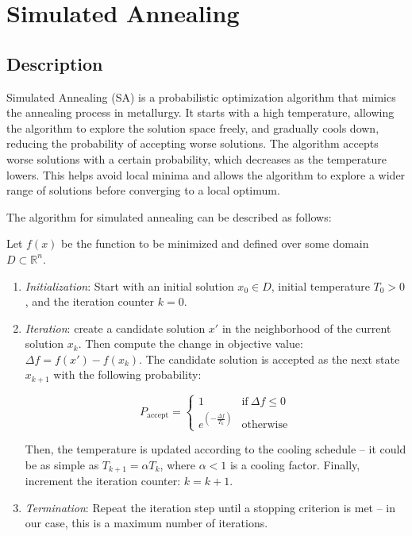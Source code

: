 \documentclass{article}
\begin{document}
\section{Simulated Annealing}

\subsection{Description}

Simulated Annealing (SA) is a probabilistic optimization algorithm
that mimics the annealing process in metallurgy. It starts with a
high temperature, allowing the algorithm to explore the solution space
freely, and gradually cools down, reducing the probability of accepting
worse solutions. The algorithm accepts worse solutions with a certain
probability, which decreases as the temperature lowers. This helps
avoid local minima and allows the algorithm to explore a wider range of
solutions before converging to a local optimum.

The algorithm for simulated annealing can be described as follows:

Let $f(x)$ be the function to be minimized and defined over some domain
$D \subset \mathbb{R}^n$.

\begin{enumerate}
  \item \textit{Initialization}: Start with an initial solution $x_0
    \in D$, initial temperature $T_0 > 0$, and the iteration counter $k = 0$.
  \item \textit{Iteration}: create a candidate solution $x'$ in the
    neighborhood of the current solution $x_k$. Then compute the
    change in objective value: $\Delta f = f(x') - f(x_k)$. The
    candidate solution is accepted as the next state $x_{k+1}$ with
    the following probability:

    $$ P_{\text{accept}} =
    \begin{cases} 1 & \text{if} \ \Delta f\leq 0\\ e^{(-\frac{\Delta f}{T_{k}})} & \text{otherwise}
    \end{cases} $$

    Then, the temperature is updated according to the cooling
    schedule -- it could be as simple as $T_{k+1} = \alpha T_k$,
    where $\alpha < 1$ is a cooling factor. Finally, increment the
    iteration counter: $k = k + 1$.
  \item \textit{Termination}: Repeat the iteration step until a
    stopping criterion is met -- in our case, this is a maximum
    number of iterations.
\end{enumerate}
\end{document}
